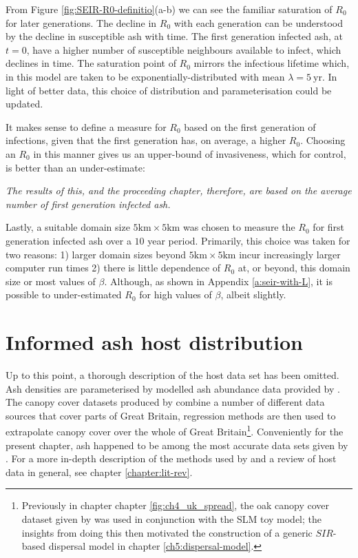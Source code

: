 From Figure \ref{fig:SEIR-R0-definitio}(a-b) we can see the familiar saturation of $R_0$ for later generations. The decline in $R_0$ with each generation can be understood by the decline in susceptible ash with time. The first generation infected ash, at $t=0$, have a higher number of susceptible neighbours available to infect, which declines in time. The saturation point of $R_0$ mirrors the infectious lifetime which, in this model are taken to be exponentially-distributed with mean $\lambda=5\ \mathrm{yr}$. In light of better data, this choice of distribution and parameterisation could be updated. 

It makes sense to define a measure for $R_0$ based on the first generation of infections, given that the first generation has, on average, a higher $R_0$. Choosing an $R_0$ in this manner gives us an upper-bound of invasiveness, which for control, is better than an under-estimate:

\textit{The results of this, and the proceeding chapter, therefore, are based on the average number of first generation infected ash.}

Lastly, a suitable domain size $5\mathrm{km} \times 5\mathrm{km}$ was chosen to measure the $R_0$ for first generation infected ash over a $10$ year period. Primarily, this choice was taken for two reasons: 1) larger domain sizes beyond $5\mathrm{km} \times 5\mathrm{km}$ incur increasingly larger computer run times 2) there is little dependence of $R_0$ at, or beyond, this domain size or most values of $\beta$. Although, as shown in Appendix \ref{a:seir-with-L}, it is possible to under-estimated $R_0$ for high values of $\beta$, albeit slightly.

\section{Informed ash host distribution}

Up to this point, a thorough description of the host data set has been omitted. Ash densities are parameterised by modelled ash abundance data provided by \cite{hill.data}. The canopy cover datasets produced by \cite{hill.data} combine a number of different data sources that cover parts of Great Britain, regression methods are then used to extrapolate canopy cover over the whole of Great Britain\footnote{Previously in chapter chapter \ref{fig:ch4_uk_spread}, the oak canopy cover dataset given by \cite{hill.data} was used in conjunction with the SLM toy model; the insights from doing this then motivated the construction of a generic $SIR$-based dispersal model in chapter \ref{ch5:dispersal-model}.}. Conveniently for the present chapter, ash happened to be among the most accurate data sets given by \cite{hill.data}. For a more in-depth description of the methods used by \cite{hill.data} and a review of host data in general, see chapter \ref{chapter:lit-rev}.

